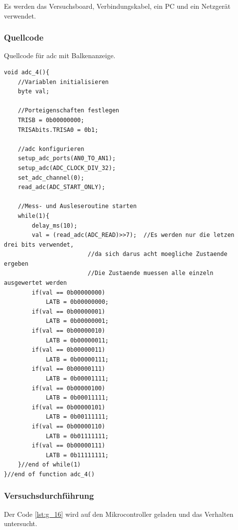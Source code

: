 \documentclass[12pt,a4paper]{article}
\begin{document}
Es werden das Versuchsboard, Verbindungskabel, ein PC und ein Netzgerät verwendet.

\subsubsection*{Quellcode}

Quellcode für adc mit Balkenanzeige.

\lstset{language=C, basicstyle=\tiny}
\begin{lstlisting}[caption = {adc mit Balkenanzeige}, label=lst:g_16,captionpos=b]
void adc_4(){
	//Variablen initialisieren
	byte val;
	
	//Porteigenschaften festlegen
	TRISB = 0b00000000;
	TRISAbits.TRISA0 = 0b1;
	
	//adc konfigurieren
	setup_adc_ports(AN0_TO_AN1);
	setup_adc(ADC_CLOCK_DIV_32);
	set_adc_channel(0);
	read_adc(ADC_START_ONLY);
	
	//Mess- und Ausleseroutine starten
	while(1){
		delay_ms(10);
		val = (read_adc(ADC_READ)>>7);	//Es werden nur die letzen drei bits verwendet,
						//da sich darus acht moegliche Zustaende ergeben
						//Die Zustaende muessen alle einzeln ausgewertet werden
		if(val == 0b00000000)
			LATB = 0b00000000;		
		if(val == 0b00000001)
			LATB = 0b00000001;
		if(val == 0b00000010)
			LATB = 0b00000011;
		if(val == 0b00000011)
			LATB = 0b00000111;		
		if(val == 0b00000111)
			LATB = 0b00001111;
		if(val == 0b00000100)
			LATB = 0b00011111;
		if(val == 0b00000101)
			LATB = 0b00111111;
		if(val == 0b00000110)
			LATB = 0b01111111;		
		if(val == 0b00000111)
			LATB = 0b11111111;					
	}//end of while(1)
}//end of function adc_4()
\end{lstlisting}

\subsubsection*{Versuchsdurchführung}

Der Code \ref{lst:g_16} wird auf den Mikrocontroller geladen und das Verhalten untersucht.
\end{document}
